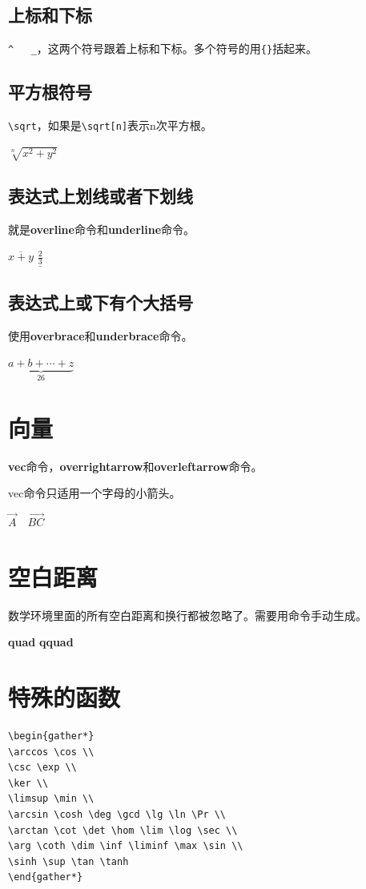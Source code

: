 \documentclass[11pt,oneside]{book}
\begin{document}
\subsection{上标和下标}
\verb+^   _+，这两个符号跟着上标和下标。多个符号的用\verb+{}+括起来。

\subsection{平方根符号}
\verb+\sqrt+，如果是\verb+\sqrt[n]+表示n次平方根。

$\sqrt[n]{x^2+y^2}$

\subsection{表达式上划线或者下划线}
就是\textbf{overline}命令和\textbf{underline}命令。

$\overline{x+y}$  $\underline{\frac{2}{3}}$

\subsection{表达式上或下有个大括号}
使用\textbf{overbrace}和\textbf{underbrace}命令。

$\underbrace{ a+b+\cdots+z }_{26}$

\section{向量}
\textbf{vec}命令，\textbf{overrightarrow}和\textbf{overleftarrow}命令。

vec命令只适用一个字母的小箭头。

$\vec {A} \quad \overrightarrow{BC}$

\section{空白距离}
数学环境里面的所有空白距离和换行都被忽略了。需要用命令手动生成。

\textbf{quad}  \textbf{qquad}


\section{特殊的函数}
\begin{Verbatim}
\begin{gather*}
\arccos \cos \\
\csc \exp \\
\ker \\
\limsup \min \\ 
\arcsin \cosh \deg \gcd \lg \ln \Pr \\ 
\arctan \cot \det \hom \lim \log \sec \\
\arg \coth \dim \inf \liminf \max \sin \\
\sinh \sup \tan \tanh
\end{gather*}
\end{Verbatim}
\end{document}
